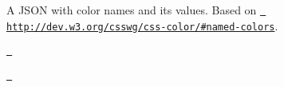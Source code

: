 A J\+S\+ON with color names and its values. Based on \href{http://dev.w3.org/csswg/css-color/\#named-colors}{\texttt{ http\+://dev.\+w3.\+org/csswg/css-\/color/\#named-\/colors}}.

\href{https://nodei.co/npm/color-name/}{\texttt{ }}


\begin{DoxyCode}{0}
\end{DoxyCode}


\href{LICENSE}{\texttt{ }} 